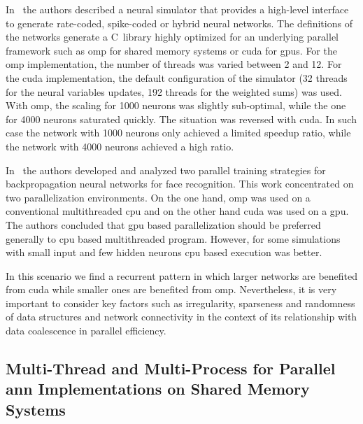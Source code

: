 \documentclass[10pt,journal,compsoc]{IEEEtran}
\newcommand{\CC}{C\nolinebreak\hspace{-.05em}\raisebox{.4ex}{\tiny\bf +}\nolinebreak\hspace{-.10em}\raisebox{.4ex}{\tiny\bf +}}
\begin{document}
In~\cite{10.3389/fninf.2015.00019} the authors described a neural simulator that provides a high-level interface to generate rate-coded, spike-coded or hybrid neural networks. The definitions of the networks generate a \CC~library highly optimized for an underlying parallel framework such as \gls{omp} for shared memory systems or \gls{cuda} for \glspl{gpu}. For the \gls{omp} implementation, the number of threads was varied between 2 and 12. For the \gls{cuda} implementation, the default configuration of the simulator (32 threads for the neural variables updates, 192 threads for the weighted sums) was used. With \gls{omp}, the scaling for 1000 neurons was slightly sub-optimal, while the one for 4000 neurons saturated quickly. The situation was reversed with \gls{cuda}. In such case the network with 1000 neurons only achieved a limited speedup ratio, while the network with 4000 neurons achieved a high ratio.

In~\cite{HUQQANI2013349} the authors developed and analyzed two parallel training strategies for backpropagation neural networks for face recognition. This work concentrated on two parallelization environments. On the one hand, \gls{omp} was used on a conventional multithreaded \gls{cpu} and on the other hand \gls{cuda} was used on a \gls{gpu}. The authors concluded that \gls{gpu} based parallelization should be preferred generally to \gls{cpu} based multithreaded program. However, for some simulations with small input and few hidden neurons \gls{cpu} based execution was better.

In this scenario we find a recurrent pattern in which larger networks are benefited from \gls{cuda} while smaller ones are benefited from \gls{omp}. Nevertheless, it is very important to consider key factors such as irregularity, sparseness and randomness of data structures and network connectivity in the context of its relationship with data coalescence in parallel efficiency.











\subsection{Multi-Thread and Multi-Process for Parallel \gls{ann} Implementations on Shared Memory Systems}
\end{document}

